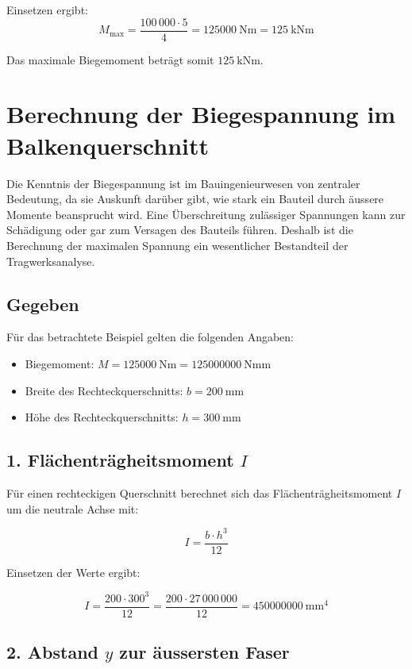 Einsetzen ergibt:
\[
M_\text{max} = \frac{100\,000 \cdot 5}{4} = \SI{125000}{\newton\meter} = \SI{125}{\kilo\newton\meter}
\]

Das maximale Biegemoment beträgt somit \(\boxed{\SI{125}{\kilo\newton\meter}}\).

\section*{Berechnung der Biegespannung im Balkenquerschnitt}

Die Kenntnis der Biegespannung ist im Bauingenieurwesen von zentraler Bedeutung, da sie Auskunft darüber gibt, wie stark ein Bauteil durch äussere Momente beansprucht wird. 
Eine Überschreitung zulässiger Spannungen kann zur Schädigung oder gar zum Versagen des Bauteils führen. 
Deshalb ist die Berechnung der maximalen Spannung ein wesentlicher Bestandteil der Tragwerksanalyse.

\subsection*{Gegeben}

Für das betrachtete Beispiel gelten die folgenden Angaben:

\begin{itemize}
  \item Biegemoment: $M = \SI{125000}{\newton\meter} = \SI{125000000}{\newton\milli\meter}$
  \item Breite des Rechteckquerschnitts: $b = \SI{200}{\milli\meter}$
  \item Höhe des Rechteckquerschnitts: $h = \SI{300}{\milli\meter}$
\end{itemize}

\subsection*{1. Flächenträgheitsmoment $I$}

Für einen rechteckigen Querschnitt berechnet sich das Flächenträgheitsmoment $I$ um die neutrale Achse mit:

\[
I = \frac{b \cdot h^3}{12}
\]

Einsetzen der Werte ergibt:

\[
I = \frac{200 \cdot 300^3}{12} = \frac{200 \cdot 27\,000\,000}{12} = \SI{450000000}{\milli\meter^4}
\]

\subsection*{2. Abstand $y$ zur äussersten Faser}

